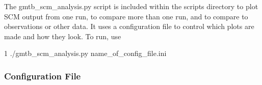 \begin{DoxyItemize}
\item The gmtb\+\_\+scm\+\_\+analysis.\+py script is included within the scripts directory to plot S\+CM output from one run, to compare more than one run, and to compare to observations or other data. It uses a configuration file to control which plots are made and how they look. To run, use
\begin{DoxyCode}
1 ./gmtb\_scm\_analysis.py name\_of\_config\_file.ini 
\end{DoxyCode}
 
\end{DoxyItemize}\hypertarget{index_plot_config}{}\subsubsection{Configuration File}\label{index_plot_config}

